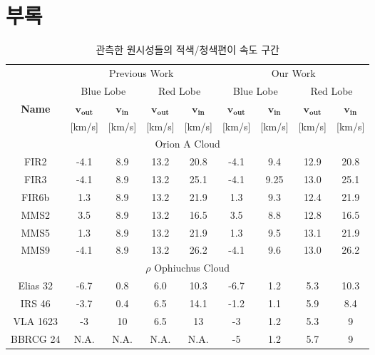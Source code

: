 \section{부록}
\begin{table}[h!]
	\begin{center}
		\begin{tabular}{c|c|c|c|c|c|c|c|c}
			\toprule
			&\multicolumn{4}{c|}{Previous Work} & \multicolumn{4}{c}{Our Work}\\
			&\multicolumn{2}{c|}{Blue Lobe} & \multicolumn{2}{c|}{Red Lobe} & \multicolumn{2}{c|}{Blue Lobe} & \multicolumn{2}{c}{Red Lobe}\\
			\textbf{Name} & $\mathbf{v_{out}}$ & $\mathbf{v_{in}}$ & $\mathbf{v_{out}}$ & $\mathbf{v_{in}}$&$\mathbf{v_{out}}$ & $\mathbf{v_{in}}$ & $\mathbf{v_{out}}$ & $\mathbf{v_{in}}$\\
			& [km/s] & [km/s] & [km/s] & [km/s] & [km/s] & [km/s] & [km/s] & [km/s] \\ 
			\midrule
			\multicolumn{9}{c}{Orion A Cloud}\\
			\midrule
			FIR2 & -4.1 & 8.9 & 13.2 & 20.8 &-4.1 & 9.4 & 12.9 & 20.8\\
			FIR3 & -4.1 & 8.9 & 13.2 & 25.1 & -4.1 & 9.25 & 13.0 & 25.1\\
			FIR6b & 1.3 & 8.9 & 13.2 & 21.9 & 1.3 & 9.3 & 12.4 & 21.9\\
			MMS2 & 3.5 & 8.9 & 13.2 & 16.5 & 3.5 & 8.8 & 12.8 & 16.5\\
			MMS5 & 1.3 & 8.9 & 13.2 & 21.9 & 1.3 & 9.5 & 13.1 & 21.9\\
			MMS9 & -4.1 & 8.9 & 13.2 & 26.2 & -4.1 & 9.6 & 13.0 & 26.2\\
			\midrule
			\multicolumn{9}{c}{$\rho$ Ophiuchus Cloud}\\
			\midrule
			Elias 32 & -6.7 & 0.8 & 6.0 & 10.3 & -6.7 & 1.2 & 5.3 & 10.3\\
			IRS 46 & -3.7 & 0.4 & 6.5 & 14.1 & -1.2 & 1.1 & 5.9 & 8.4\\
			VLA 1623 & -3 & 10 & 6.5 & 13 & -3 & 1.2 & 5.3 & 9\\
			BBRCG 24 & N.A. & N.A. & N.A. & N.A. & -5 & 1.2 & 5.7 & 9\\
		\end{tabular}
	\end{center}
	\caption{관측한 원시성들의 적색/청색편이 속도 구간}
\end{table}